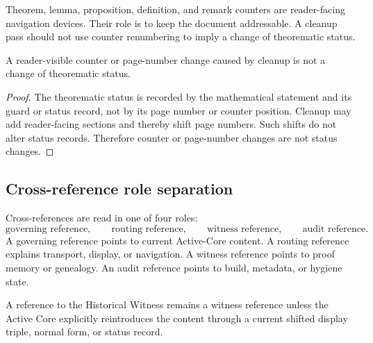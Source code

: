 \begin{definition}
\label{def:v4011-counter-hygiene-rule}
Theorem, lemma, proposition, definition, and remark counters are reader-facing
navigation devices. Their role is to keep the document addressable. A cleanup
pass should not use counter renumbering to imply a change of theorematic status.
\end{definition}

\begin{proposition}
\label{prop:v4011-counter-changes-not-status-changes}
A reader-visible counter or page-number change caused by cleanup is not a change
of theorematic status.
\end{proposition}

\begin{proof}
The theorematic status is recorded by the mathematical statement and its guard
or status record, not by its page number or counter position. Cleanup may add
reader-facing sections and thereby shift page numbers. Such shifts do not
alter status records. Therefore counter or page-number changes are not status
changes.
\end{proof}

\subsection{Cross-reference role separation}
\label{subsec:v4011-cross-reference-role-separation}

\begin{definition}
\label{def:v4011-cross-reference-roles}
Cross-references are read in one of four roles:
\[
 \text{governing reference},\qquad
 \text{routing reference},\qquad
 \text{witness reference},\qquad
 \text{audit reference}.
\]
A governing reference points to current Active-Core content. A routing
reference explains transport, display, or navigation. A witness reference
points to proof memory or genealogy. An audit reference points to build,
metadata, or hygiene state.
\end{definition}

\begin{remark}
\label{rem:v4011-witness-references-non-governing}
A reference to the Historical Witness remains a witness reference unless the
Active Core explicitly reintroduces the content through a current shifted display
triple, normal form, or status record.
\end{remark}

